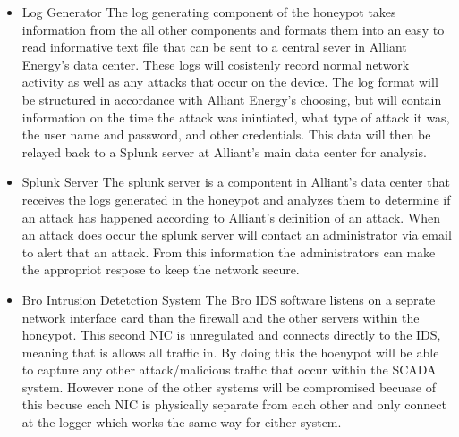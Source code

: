 \begin{itemize}
\item Log Generator
The log generating component of the honeypot takes information from the all other components and formats them into an easy to read informative text file that can be sent to a central sever in Alliant Energy's data center.  These logs will cosistenly record normal network activity as well as any attacks that occur on the device.  The log format will be structured in accordance with Alliant Energy's choosing, but will contain information on the time the attack was inintiated, what type of attack it was, the user name and password, and other credentials.  This data will then be relayed back to a Splunk server at Alliant's main data center for analysis.

\item Splunk Server
The splunk server is a compontent in Alliant's data center that receives the logs generated in the honeypot and analyzes them to determine if an attack has happened according to Alliant's definition of an attack.  When an attack does occur the splunk server will contact an administrator via email to alert that an attack.  From this information the administrators can make  the appropriot respose to keep the network secure.

\item Bro Intrusion Detetction System
The Bro IDS software listens on a seprate network interface card than the firewall and the other servers within the honeypot.  This second NIC is unregulated and connects directly to the IDS, meaning that is allows all traffic in.  By doing this the hoenypot will be able to capture any other attack/malicious traffic that occur within the SCADA system.  However none of the other systems will be compromised becuase of this becuse each NIC is physically separate from each other and only connect at the logger which works the same way for either system.  


\end{itemize}

